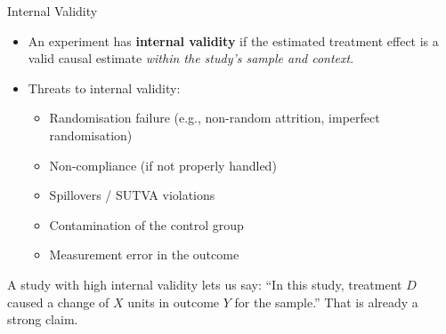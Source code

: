 \documentclass[aspectratio=169, 11pt]{beamer}
\begin{document}

\begin{frame}[t]{Internal Validity}
\begin{itemize}
  \setlength\itemsep{0.5em}
  \item An experiment has \textbf{internal validity} if the estimated treatment effect
        is a valid causal estimate \emph{within the study's sample and context}.
  \item Threats to internal validity:
    \begin{itemize}
      \item Randomisation failure (e.g., non-random attrition, imperfect randomisation)
      \item Non-compliance (if not properly handled)
      \item Spillovers / SUTVA violations
      \item Contamination of the control group
      \item Measurement error in the outcome
    \end{itemize}
\end{itemize}
\vspace{0.3em}
\begin{keybox}
A study with high internal validity lets us say: ``In this study,
treatment $D$ caused a change of $X$ units in outcome $Y$ for the sample.''
That is already a strong claim.
\end{keybox}
\end{frame}
\end{document}
